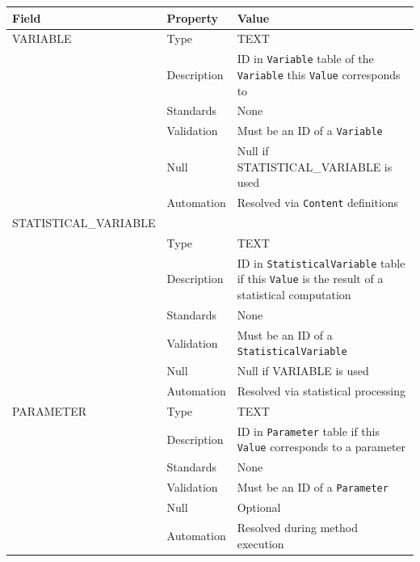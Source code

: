 \documentclass[
]{article}
\newcounter{none}
\begin{document}
{\def\LTcaptype{none} 
\begin{longtable}[]{@{}
  >{\raggedright\arraybackslash}p{}
  >{\raggedright\arraybackslash}p{}
  >{\raggedright\arraybackslash}p{}@{}}
\toprule\noalign{}
\begin{minipage}[b]{\linewidth}\raggedright
Field
\end{minipage} & \begin{minipage}[b]{\linewidth}\raggedright
Property
\end{minipage} & \begin{minipage}[b]{\linewidth}\raggedright
Value
\end{minipage} \\
\midrule\noalign{}
\endhead
\bottomrule\noalign{}
\endlastfoot
VARIABLE & Type & TEXT \\
& Description & ID in \texttt{Variable} table of the \texttt{Variable}
this \texttt{Value} corresponds to \\
& Standards & None \\
& Validation & Must be an ID of a \texttt{Variable} \\
& Null & Null if STATISTICAL\_VARIABLE is used \\
& Automation & Resolved via \texttt{Content} definitions \\
STATISTICAL\_VARIABLE & & \\
& Type & TEXT \\
& Description & ID in \texttt{StatisticalVariable} table if this
\texttt{Value} is the result of a statistical computation \\
& Standards & None \\
& Validation & Must be an ID of a \texttt{StatisticalVariable} \\
& Null & Null if VARIABLE is used \\
& Automation & Resolved via statistical processing \\
PARAMETER & Type & TEXT \\
& Description & ID in \texttt{Parameter} table if this \texttt{Value}
corresponds to a parameter \\
& Standards & None \\
& Validation & Must be an ID of a \texttt{Parameter} \\
& Null & Optional \\
& Automation & Resolved during method execution \\

\end{longtable}}
\end{document}
